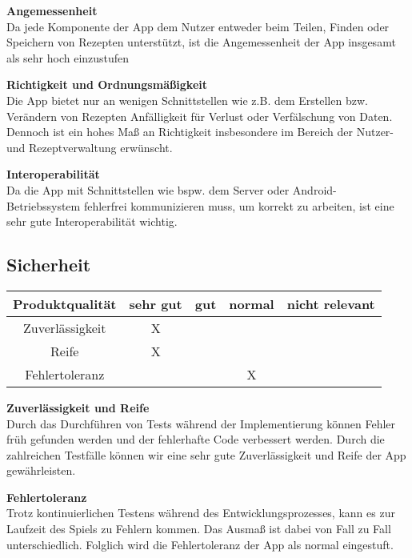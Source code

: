 \documentclass[parskip=full]{scrartcl}
\begin{document}
\textbf{Angemessenheit}\\
Da jede Komponente der App dem Nutzer entweder beim Teilen, Finden oder Speichern von Rezepten unterstützt, ist die Angemessenheit der App insgesamt als sehr hoch einzustufen

\textbf{Richtigkeit und Ordnungsmäßigkeit}\\
Die App bietet nur an wenigen Schnittstellen wie z.B. dem Erstellen bzw. Verändern von Rezepten Anfälligkeit für Verlust oder Verfälschung von Daten. Dennoch ist ein hohes Maß an Richtigkeit insbesondere im Bereich der Nutzer- und Rezeptverwaltung erwünscht.

\textbf{Interoperabilität}\\
Da die App mit Schnittstellen wie bspw. dem Server oder Android-Betriebssystem fehlerfrei kommunizieren muss, um korrekt zu arbeiten, ist eine sehr gute Interoperabilität wichtig.

\subsection{Sicherheit}
\begin{tabular}{| c | c | c | c | c |}
    \hline
    \textbf{Produktqualität} & \textbf{sehr gut} & \textbf{gut} & \textbf{normal} & \textbf{nicht relevant} \\ \hline
    Zuverlässigkeit          & X                 &              &                 &                         \\ \hline
    Reife                    & X                 &              &                 &                         \\ \hline
    Fehlertoleranz           &                   &              & X               &                         \\ \hline
\end{tabular}

\textbf{Zuverlässigkeit und Reife}\\
Durch das Durchführen von Tests während der Implementierung können Fehler früh gefunden werden und der fehlerhafte Code verbessert werden.
Durch die zahlreichen Testfälle können wir eine sehr gute Zuverlässigkeit und Reife der App gewährleisten.

\textbf{Fehlertoleranz}\\
Trotz kontinuierlichen Testens während des Entwicklungsprozesses, kann es zur Laufzeit des Spiels zu Fehlern kommen.
Das Ausmaß ist dabei von Fall zu Fall unterschiedlich.
Folglich wird die Fehlertoleranz der App als normal eingestuft.
\end{document}
